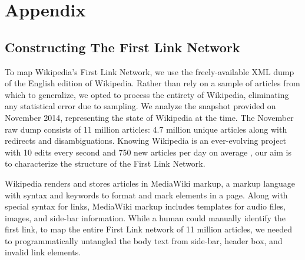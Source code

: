 \documentclass[pre,twocolumn,twoside,superscriptaddress,floatfix]{revtex4-1}
\begin{document}
{\newpage

\section{Appendix}
\label{Appendix}

\subsection{Constructing The First Link Network}

To map Wikipedia's First Link Network, we use the freely-available XML dump of the English edition of Wikipedia. 
Rather than rely on a sample of articles from which to generalize, we opted to process the entirety of Wikipedia, 
eliminating any statistical error due to sampling.
We analyze the snapshot provided on November 2014, representing the state of Wikipedia at the time.
The November raw dump consists of 11 million articles: 4.7 million unique articles along with redirects
and disambiguations.
Knowing Wikipedia is an ever-evolving project with 10 edits every second and 750 new articles per day on average
\cite{wiki_edits},
our aim is to characterize the structure of the First Link Network.

Wikipedia renders and stores articles in MediaWiki markup, a markup language with syntax and keywords to format and mark elements in a page. Along with special syntax for links, MediaWiki markup includes templates for audio files, images, and side-bar
information.
While a human could manually identify the first link, to map the entire First Link network of 11 million articles, we needed to programmatically untangled the body text from side-bar, header box, and invalid link elements.

}
\end{document}
